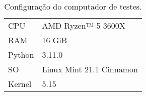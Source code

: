 \begin{table}
    \centering
    \caption{Configuração do computador de testes.}
    \label{tab:config}
    \begin{tabular}{ll}
        \hline
        CPU    & AMD Ryzen™ 5 3600X       \\
        RAM    & 16 GiB                   \\
        Python & 3.11.0                   \\
        SO     & Linux Mint 21.1 Cinnamon \\
        Kernel & 5.15                     \\
        \hline
    \end{tabular}
\end{table}
